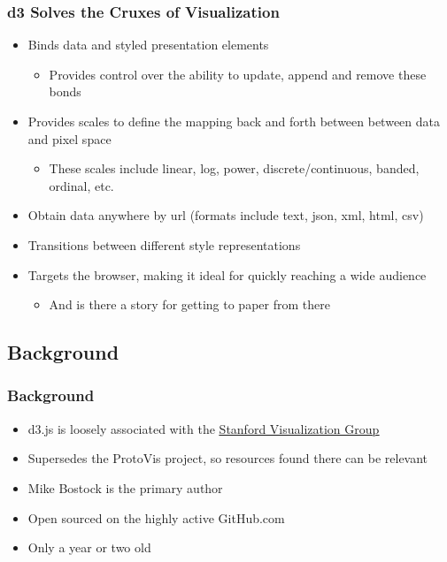 \documentclass{beamer}
\begin{document}
\begin{frame}
\frametitle{d3 Solves the Cruxes of Visualization}
\begin{itemize}
\item Binds data and styled presentation elements 
    \begin{itemize}
    \item Provides control over the ability to update, append and remove these bonds
    \end{itemize}
\pause
\item Provides scales to define the mapping back and forth between between data and pixel space
    \begin{itemize}
    \item These scales include linear, log, power, discrete/continuous, banded, ordinal, etc.
    \end{itemize}
\end{itemize}
\end{frame}



\begin{frame}
\begin{itemize}
\frametitle{d3 Solves the Cruxes of Visualization}
\item Obtain data anywhere by url (formats include text, json, xml, html, csv)
\pause
\item Transitions between different style representations
\pause
\item Targets the browser, making it ideal for quickly reaching a wide audience
    \begin{itemize}
    \item And is there a story for getting to paper from there
    \end{itemize}
\end{itemize}
\end{frame}



\subsection{Background}


\begin{frame}
\frametitle{Background}
\begin{itemize}
\item d3.js is loosely associated with the \href{http://vis.stanford.edu/}{\underline{Stanford Visualization Group}}
\pause
\item Supersedes the ProtoVis project, so resources found there can be relevant
\pause
\item Mike Bostock is the primary author
\item Open sourced on the highly active GitHub.com
\item Only a year or two old
\end{itemize}
\end{frame}
\end{document}
